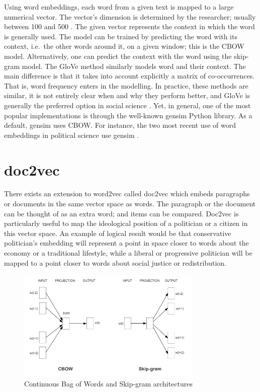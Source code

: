 \documentclass[
  openany]{book}
\begin{document}
Using word embeddings, each word from a given text is mapped to a large numerical vector. The vector's dimension is determined by the researcher; usually between 100 and 500 \citet{rodman2020timely}. The given vector represents the context in which the word is generally used. The model can be trained by predicting the word with its context, i.e.~the other words around it, on a given window; this is the CBOW model. Alternatively, one can predict the context with the word using the skip-gram model. The GloVe method similarly models word and their context. The main difference is that it takes into account explicitly a matrix of co-occurrences. That is, word frequency enters in the modelling. In practice, these methods are similar, it is not entirely clear when and why they perform better, and GloVe is generally the preferred option in social science \citet{rodriguez2021word}. Yet, in general, one of the most popular implementations is through the well-known gensim Python library. As a default, gensim uses CBOW. For instance, the two most recent use of word embeddings in political science use gensim \citep[\citet{rheault2020word}]{rodman2020timely}.

\hypertarget{doc2vec}{%
\section{doc2vec}\label{doc2vec}}

There exists an extension to word2vec called doc2vec which embeds paragraphs or documents in the same vector space as words. The paragraph or the document can be thought of as an extra word; and items can be compared. Doc2vec is particularly useful to map the ideological position of a politician or a citizen in this vector space. An example of logical result would be that conservative politician's embedding will represent a point in space closer to words about the economy or a traditional lifestyle, while a liberal or progressive politician will be mapped to a point closer to words about social justice or redistribution.

\begin{figure}
\centering
\includegraphics{figures/methodology-cbow-skipgram.png}
\caption{\label{fig:unnamed-chunk-2}Continuous Bag of Words and Skip-gram architectures}
\end{figure}
\end{document}
